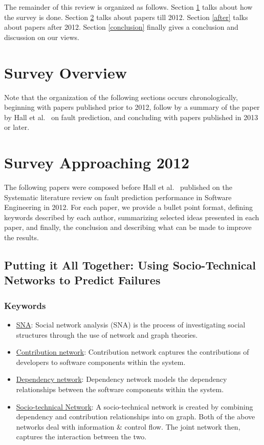 \documentclass[conference]{IEEEtran}
\begin{document}
The remainder of this review is organized as follows. Section \ref{survey} talks about how the survey is done. Section \ref{approaching} talks about papers till 2012. Section \ref{after} talks about papers after 2012. Section \ref{conclusion} finally gives a conclusion and discussion on our views.

\section{Survey Overview}
\label{survey}
Note that the organization of the following sections occurs
chronologically, beginning with papers published prior to
2012, follow by a summary of the paper by Hall et al.~\cite{hall2012systematic} on
fault prediction, and concluding with papers published in 2013 or later.

\section{Survey Approaching 2012}
\label{approaching}
The following papers were composed before Hall et al.~\cite{hall2012systematic}
published on the Systematic literature review on fault prediction performance in Software Engineering in 2012. For each paper, we 
provide a bullet point format, defining keywords described by each author, summarizing selected ideas presented in each paper, and finally, the conclusion and describing what can be made to improve the results.

\subsection{\textbf{Putting it All Together:
Using Socio-Technical Networks to Predict Failures~\cite{bird2009putting}}}
\subsubsection{\textbf{Keywords}}
\begin{itemize}
    \item \underline{SNA}: Social network analysis (SNA) is the process of investigating social structures through the use of network and graph theories.
    \item \underline{Contribution network}: Contribution network captures the contributions of developers to software components within the system.
    \item \underline{Dependency network}: Dependency network models the dependency relationships between the software components within the system.
    \item \underline{Socio-technical Network}: A socio-technical network is created by combining dependency and contribution relationships into on graph. Both of the above networks deal with information \& control flow. The joint network then, captures the interaction between the two.
\end{itemize}
\end{document}
